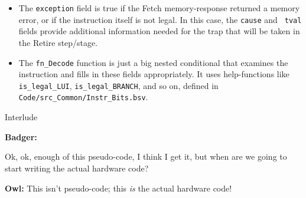 \begin{frame}[fragile]
\begin{center}
\begin{minipage}{0.8\textwidth}
\begin{itemize}
   \item The {\tt exception} field is true if the Fetch
     memory-response returned a memory error, or if the instruction
     itself is not legal.  In this case, the {\tt cause} and {\tt
     tval} fields provide additional information needed for the trap
     that will be taken in the Retire step/stage.

   \item The {\tt fn\_Decode} function is just a big nested
     conditional that examines the instruction and fills in these
     fields appropriately.  It uses help-functions like {\tt
     is\_legal\_LUI}, {\tt is\_legal\_BRANCH}, and so on, defined in
     {\tt Code/src\_Common/Instr\_Bits.bsv}.

  \end{itemize}

 \end{minipage}
\end{center}

\end{frame}


\begin{frame}[fragile]

\begin{center}
  {\LARGE Interlude}

 \vspace*{10ex}

 \begin{minipage}{0.9\textwidth}

  {\bf Badger:} \begin{minipage}[t]{0.8\textwidth}
                 Ok, ok, enough of this pseudo-code, I think I get it,
                 but when are we going to start writing the actual hardware code?
		\end{minipage}

  \vspace*{5ex}

  {\bf Owl:} This isn't pseudo-code; this \emph{is} the actual hardware code!

 \end{minipage}

\end{center}

\end{frame}


